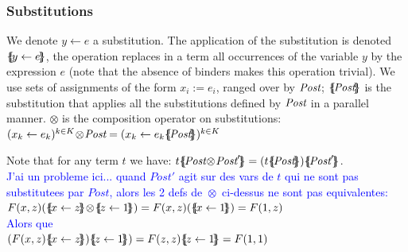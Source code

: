 \documentclass{lmcs}
\newcommand{\ERIC}[1]{\textcolor{blue}{#1}}
\newcommand{\shortotimes}{\!\otimes\!}
\begin{document}

\subsubsection*{Substitutions}

We denote $y\gets e$ a substitution. The application of the substitution is denoted
$\{\hspace{-0.88ex}\{\!y\gets e\!\}\hspace{-0.87ex}\}$, the operation replaces in a term all occurrences 
of the variable $y$ by the expression $e$ (note that the absence of binders makes this operation 
trivial). 
We use sets of assignments of the form $x_i:=e_i$, ranged over by $\Post$; $\subst{\Post}$ is the substitution that applies all the substitutions defined by $\Post$ in a parallel manner. $\otimes$ is the composition operator on substitutions: $(x_k\gets e_k)^{k\in K}\shortotimes \Post =  (x_k\gets e_k\subst{\Post})^{k\in K}$


Note that for any term $t$ we have: $t\subst{\Post\shortotimes\Post'} = (t\subst{\Post})\subst{\Post'}$.\\
\ERIC{J'ai un probleme ici... quand $Post'$ agit sur des vars de $t$ qui ne sont pas substitutees par $Post$, alors les 2 defs de $\shortotimes$ ci-dessus ne sont pas equivalentes:}\\
$F(x,z)(\subst{x\gets z}\shortotimes\subst{z\gets 1})=F(x,z)(\subst{x\gets 1})=F(1,z)$\\
\ERIC{Alors que}\\
$(F(x,z)\subst{x\gets z})\subst{z\gets 1})=F(z,z)\subst{z\gets 1}=F(1,1)$
\end{document}

